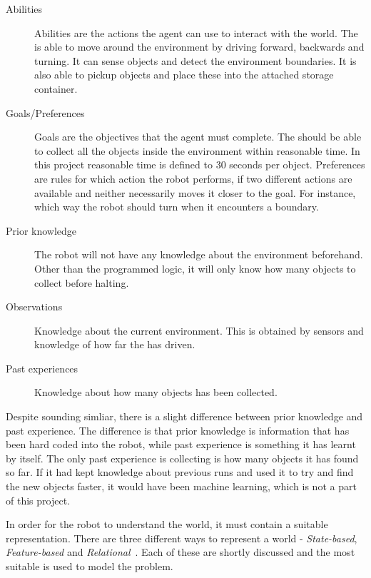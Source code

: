 \begin{description}
\item[Abilities] Abilities are the actions the agent can use to interact with the world. The \projname{} is able to move around the environment by driving forward, backwards and turning. It can sense objects and detect the environment boundaries. It is also able to pickup objects and place these into the attached storage container.  
\item[Goals/Preferences] Goals are the objectives that the agent must complete. The \projname{} should be able to collect all the objects inside the environment within reasonable time. In this project reasonable time is defined to 30 seconds per object. Preferences are rules for which action the robot performs, if two different actions are available and neither necessarily moves it closer to the goal. For instance, which way the robot should turn when it encounters a boundary.
\item[Prior knowledge] The robot will not have any knowledge about the environment beforehand. Other than the programmed logic, it will only know how many objects to collect before halting.
\item[Observations] Knowledge about the current environment. This is obtained by sensors and knowledge of how far the \projname{} has driven. 
\item[Past experiences] Knowledge about how many objects has been collected. 
\end{description}

Despite sounding simliar, there is a slight difference between prior knowledge and past experience. The difference is that prior knowledge is information that has been hard coded into the robot, while past experience is something it has learnt by itself. The only past experience \projname{} is collecting is how many objects it has found so far. If it had kept knowledge about previous runs and used it to try and find the new objects faster, it would have been machine learning, which is not a part of this project.

In order for the robot to understand the world, it must contain a suitable representation. There are three different ways to represent a world - \emph{State-based}, \emph{Feature-based} and \emph{Relational}~\citep{artificialintelligencebook}. Each of these are shortly discussed and the most suitable is used to model the problem. 

